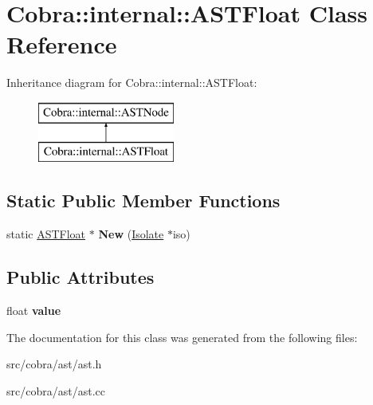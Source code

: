 \hypertarget{class_cobra_1_1internal_1_1_a_s_t_float}{\section{Cobra\+:\+:internal\+:\+:A\+S\+T\+Float Class Reference}
\label{class_cobra_1_1internal_1_1_a_s_t_float}
}
Inheritance diagram for Cobra\+:\+:internal\+:\+:A\+S\+T\+Float\+:\begin{figure}[H]
\begin{center}
\leavevmode
\includegraphics[height=2.000000cm]{class_cobra_1_1internal_1_1_a_s_t_float}
\end{center}
\end{figure}
\subsection*{Static Public Member Functions}
\begin{DoxyCompactItemize}
\item 
\hypertarget{class_cobra_1_1internal_1_1_a_s_t_float_a36a9b861c31edc9e55aad0eaf4e4ec9c}{static \hyperlink{class_cobra_1_1internal_1_1_a_s_t_float}{A\+S\+T\+Float} $\ast$ {\bfseries New} (\hyperlink{class_cobra_1_1internal_1_1_isolate}{Isolate} $\ast$iso)}\label{class_cobra_1_1internal_1_1_a_s_t_float_a36a9b861c31edc9e55aad0eaf4e4ec9c}

\end{DoxyCompactItemize}
\subsection*{Public Attributes}
\begin{DoxyCompactItemize}
\item 
\hypertarget{class_cobra_1_1internal_1_1_a_s_t_float_ae6955ebe85532ecd20cc8dd4f721f6fe}{float {\bfseries value}}\label{class_cobra_1_1internal_1_1_a_s_t_float_ae6955ebe85532ecd20cc8dd4f721f6fe}

\end{DoxyCompactItemize}


The documentation for this class was generated from the following files\+:\begin{DoxyCompactItemize}
\item 
src/cobra/ast/ast.\+h\item 
src/cobra/ast/ast.\+cc\end{DoxyCompactItemize}
